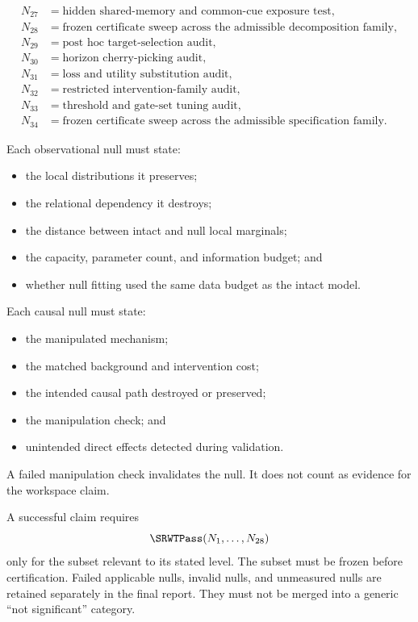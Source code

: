 \[\begin{aligned}
N_{27}&=\text{hidden shared-memory and common-cue exposure test},\\
N_{28}&=\text{frozen certificate sweep across the admissible decomposition family},\\
N_{29}&=\text{post hoc target-selection audit},\\
N_{30}&=\text{horizon cherry-picking audit},\\
N_{31}&=\text{loss and utility substitution audit},\\
N_{32}&=\text{restricted intervention-family audit},\\
N_{33}&=\text{threshold and gate-set tuning audit},\\
N_{34}&=\text{frozen certificate sweep across the admissible specification family}.
\end{aligned}
\]


Each observational null must state:
\begin{itemize}
\item the local distributions it preserves;
\item the relational dependency it destroys;
\item the distance between intact and null local marginals;
\item the capacity, parameter count, and information budget; and
\item whether null fitting used the same data budget as the intact model.
\end{itemize}
Each causal null must state:
\begin{itemize}
\item the manipulated mechanism;
\item the matched background and intervention cost;
\item the intended causal path destroyed or preserved;
\item the manipulation check; and
\item unintended direct effects detected during validation.
\end{itemize}
A failed manipulation check invalidates the null. It does not count as evidence
for the workspace claim.


A successful claim requires
\[
\SRWTPass(N_1,\ldots,N_{28})
\]
only for the subset relevant to its stated level. The subset must be frozen
before certification. Failed applicable nulls, invalid nulls, and unmeasured
nulls are retained separately in the final report. They must not be merged
into a generic ``not significant'' category.

